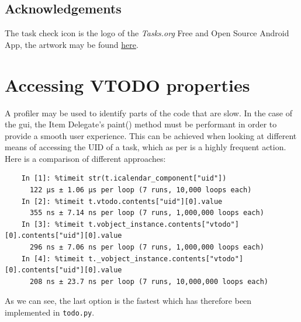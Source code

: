 \documentclass{prettytex/ox/mmsc-special-topic}
\begin{document}
  \subsection{Acknowledgements}
  The task check icon is the logo of the \textit{Tasks.org} Free and Open Source Android App, the artwork may be found \href{https://github.com/tasks/tasks/tree/main/graphics}{here}.

  \pagebreak
  \printbibliography
  \printnoidxglossary[type=acronym]

  \appendix
  \section{Accessing VTODO properties}
  A profiler may be used to identify parts of the code that are slow.
  In the case of the \gls{gui}, the Item Delegate's paint() method must be performant in order to provide a smooth user experience.
  This can be achieved when looking at different means of accessing the UID of a task, which as per  is a highly frequent action.
  Here is a comparison of different approaches:

  \begin{verbatim}
    In [1]: %timeit str(t.icalendar_component["uid"])
      122 µs ± 1.06 µs per loop (7 runs, 10,000 loops each)
    In [2]: %timeit t.vtodo.contents["uid"][0].value
      355 ns ± 7.14 ns per loop (7 runs, 1,000,000 loops each)
    In [3]: %timeit t.vobject_instance.contents["vtodo"][0].contents["uid"][0].value
      296 ns ± 7.06 ns per loop (7 runs, 1,000,000 loops each)
    In [4]: %timeit t._vobject_instance.contents["vtodo"][0].contents["uid"][0].value
      208 ns ± 23.7 ns per loop (7 runs, 10,000,000 loops each)
  \end{verbatim}

  As we can see, the last option is the fastest which has therefore been implemented in \texttt{todo.py}.
\end{document}
